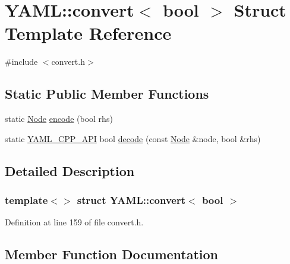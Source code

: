 \hypertarget{struct_y_a_m_l_1_1convert_3_01bool_01_4}{}\section{Y\+A\+ML\+::convert$<$ bool $>$ Struct Template Reference}
\label{struct_y_a_m_l_1_1convert_3_01bool_01_4}


{\ttfamily \#include $<$convert.\+h$>$}

\subsection*{Static Public Member Functions}
\begin{DoxyCompactItemize}
\item 
static \mbox{\hyperlink{class_y_a_m_l_1_1_node}{Node}} \mbox{\hyperlink{struct_y_a_m_l_1_1convert_3_01bool_01_4_accf9335d8cf7bc9698c47de0c91d111d}{encode}} (bool rhs)
\item 
static \mbox{\hyperlink{dll_8h_a70903db05b58f40db9aa4f966658fa65}{Y\+A\+M\+L\+\_\+\+C\+P\+P\+\_\+\+A\+PI}} bool \mbox{\hyperlink{struct_y_a_m_l_1_1convert_3_01bool_01_4_a97da36ccc9942ba6aeabab04b6fc82b4}{decode}} (const \mbox{\hyperlink{class_y_a_m_l_1_1_node}{Node}} \&node, bool \&rhs)
\end{DoxyCompactItemize}


\subsection{Detailed Description}
\subsubsection*{template$<$$>$\newline
struct Y\+A\+M\+L\+::convert$<$ bool $>$}



Definition at line 159 of file convert.\+h.



\subsection{Member Function Documentation}
\mbox{\label{struct_y_a_m_l_1_1convert_3_01bool_01_4_a97da36ccc9942ba6aeabab04b6fc82b4}} 
